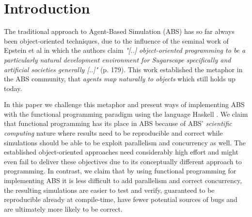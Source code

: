 \section{Introduction}
The traditional approach to Agent-Based Simulation (ABS) has so far always been object-oriented techniques, due to the influence of the seminal work of Epstein et al \cite{epstein_growing_1996} in which the authors claim \textit{"[..] object-oriented programming to be a particularly natural development environment for Sugarscape specifically and artificial societies generally [..]"} (p. 179). This work established the metaphor in the ABS community, that \textit{agents map naturally to objects} \cite{north_managing_2007} which still holds up today.

In this paper we challenge this metaphor and present ways of implementing ABS with the functional programming paradigm using the language Haskell \cite{hudak_history_2007}. We claim that functional programming has its place in ABS because of ABS' \textit{scientific computing} nature where results need to be reproducible and correct while simulations should be able to be exploit parallelism and concurrency as well. The established object-oriented approaches need considerably high effort and might even fail to deliver these objectives due to its conceptually different approach to programming. In contrast, we claim that by using functional programming for implementing ABS it is less difficult to add parallelism and correct concurrency, the resulting simulations are easier to test and verify, guaranteed to be reproducible already at compile-time, have fewer potential sources of bugs and are ultimately more likely to be correct. 

